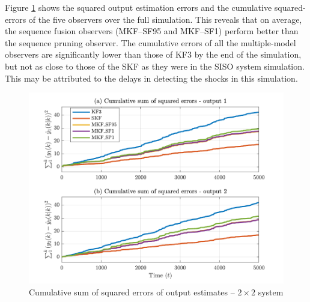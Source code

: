 Figure \ref{fig:sim-sys-sim2-MKF-cumerr} shows the squared output estimation errors and the cumulative squared-errors of the five observers over the full simulation. This reveals that on average, the sequence fusion observers (MKF--SF95 and MKF--SF1) perform better than the sequence pruning observer. The cumulative errors of all the multiple-model observers are significantly lower than those of KF3 by the end of the simulation, but not as close to those of the \gls{SKF} as they were in the SISO system simulation. This may be attributed to the delays in detecting the shocks in this simulation.
\begin{figure}[htp]
	\centering
	\includegraphics[width=13cm]{images/rod_obs_sim3_all_seed_cum_err_y2.pdf}
	\caption{Cumulative sum of squared errors of output estimates –  $2\times2$ system}
	\label{fig:sim-sys-sim2-MKF-cumerr}
\end{figure}

